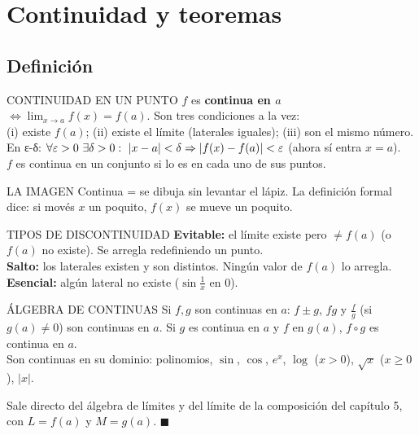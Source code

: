 \chapter{Continuidad y teoremas}

\section{Definición}
\agregado
\begin{sello}{CONTINUIDAD EN UN PUNTO}
$f$ es \textbf{continua en $a$} $\iff\lim_{x\to a}f(x)=f(a)$. Son tres condiciones a la vez:\\[2pt]
(i) existe $f(a)$; \quad (ii) existe el límite (laterales iguales); \quad (iii) son el mismo número.\\[3pt]
En ε-δ: $\forall\eps>0\ \exists\delta>0:\ |x-a|<\delta\Rightarrow|f(x)-f(a)|<\eps$ (ahora sí entra $x=a$).\\[2pt]
$f$ es continua en un conjunto si lo es en cada uno de sus puntos.
\end{sello}
\begin{tip}{LA IMAGEN}
Continua = se dibuja sin levantar el lápiz. La definición formal dice: si movés $x$ un poquito, $f(x)$ se mueve un poquito.
\end{tip}
\begin{memo}{TIPOS DE DISCONTINUIDAD}
\textbf{Evitable:} el límite existe pero $\neq f(a)$ (o $f(a)$ no existe). Se arregla redefiniendo un punto.\\
\textbf{Salto:} los laterales existen y son distintos. Ningún valor de $f(a)$ lo arregla.\\
\textbf{Esencial:} algún lateral no existe ($\sin\frac1x$ en 0).
\end{memo}

\agregado
\begin{sello}{ÁLGEBRA DE CONTINUAS}
Si $f,g$ son continuas en $a$: $f\pm g$, $fg$ y $\frac fg$ (si $g(a)\neq0$) son continuas en $a$. Si $g$ es continua en $a$ y $f$ en $g(a)$, $f\circ g$ es continua en $a$.\\[3pt]
Son continuas en su dominio: polinomios, $\sin$, $\cos$, $e^x$, $\log$ ($x>0$), $\sqrt x$ ($x\ge0$), $|x|$.
\end{sello}
\begin{demo}
Sale directo del álgebra de límites y del límite de la composición del capítulo 5, con $L=f(a)$ y $M=g(a)$. $\blacksquare$
\end{demo}

